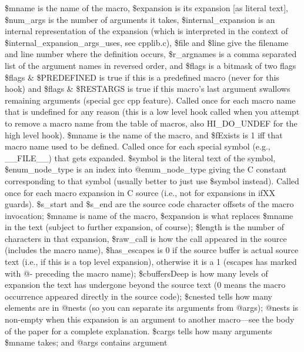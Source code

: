\$mname is the name of the macro, \$expansion is its expansion [as literal text], 
\$num\_\-args is the number of arguments it takes, \$internal\_\-expansion is an
internal representation of the expansion (which is interpreted in the 
context of \$internal\_\-expansion\_\-args\_\-uses, see cpplib.c), \$file and \$line
give the filename and line number where the definition occurs, 
\$r\_\-argnames is a comma separated list of the
argument names in reversed order, and \$flags is a bitmask of two flags
\$flags \& \$PREDEFINED is true if this is a predefined macro (never for this hook)
and \$flags \& \$RESTARGS is true if this macro's last argument swallows 
remaining arguments (special gcc cpp feature).
Called once for each macro name that is undefined for any reason (this is
a low level hook called when you attempt to remove a macro name from the 
table of macros,
also HI\_\-DO\_\-UNDEF for the high level hook).  \$mname is the name of the
macro, and \$fExists is 1 iff that macro name used to be defined.
Called once for each special symbol (e.g., \_\-\_\-FILE\_\-\_\-) that gets expanded.
\$symbol is the literal text of the symbol, \$enum\_\-node\_\-type is an index
into @enum\_\-node\_\-type giving the C constant corresponding to that symbol
(usually better to just use \$symbol instead).
Called once for each macro expansion in C source (i.e., not for expansions
in \pphash{}ifXX guards). \$s\_\-start and \$s\_\-end are the source code character offsets
of the macro invocation; \$mname is name of the macro, \$expansion is what
replaces \$mname in the text (subject to further expansion, of course); \$length
is the number of characters in that expansion, \$raw\_\-call is how the call
appeared in the source (includes the macro name), \$has\_\-escapes is 0 if the
source buffer is actual source text (i.e., if this is a top level expansion),
otherwise it is a 1 (escapes has marked with @- preceding the macro name);
\$cbuffersDeep is how many levels of expansion the text
has undergone beyond the source text (0 means the macro occurrence appeared
directly in the source code); \$cnested tells how many elements are in @nests
(so you can separate its arguments from @args); @nests is non-empty when this
expansion is an argument to another macro---see the body of the paper for 
a complete explanation.
\$cargs tells how many arguments \$mname takes; and @args contains argument
